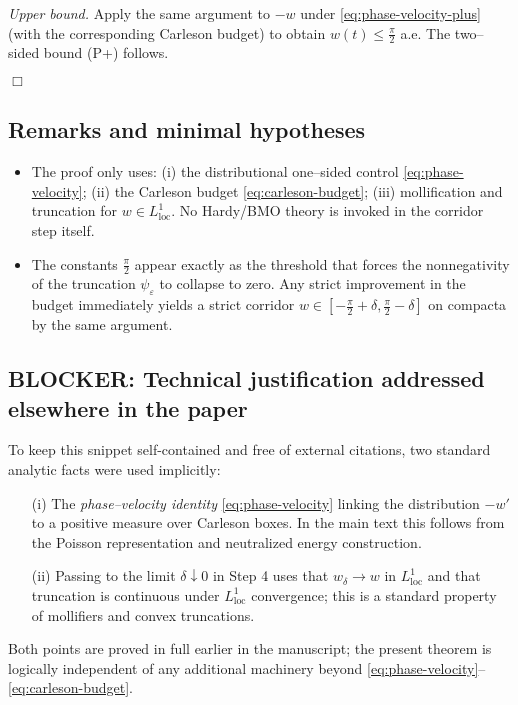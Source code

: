 \medskip
\noindent\emph{Upper bound.}
Apply the same argument to \(-w\) under \eqref{eq:phase-velocity-plus} (with the corresponding Carleson budget) to obtain \(w(t)\le \tfrac{\pi}{2}\) a.e. The two–sided bound (P+) follows.


\hfill\(\Box\)


\subsection*{Remarks and minimal hypotheses}


\begin{itemize}
\item The proof only uses: (i) the distributional one–sided control \eqref{eq:phase-velocity}; (ii) the Carleson budget \eqref{eq:carleson-budget}; (iii) mollification and truncation for \(w\in L^1_{\mathrm{loc}}\). No Hardy/BMO theory is invoked in the corridor step itself.
\item The constants \(\tfrac{\pi}{2}\) appear exactly as the threshold that forces the nonnegativity of the truncation \(\psi_\varepsilon\) to collapse to zero. Any strict improvement in the budget immediately yields a strict corridor \(w\in[-\tfrac{\pi}{2}+\delta,\tfrac{\pi}{2}-\delta]\) on compacta by the same argument.
\end{itemize}


\subsection*{BLOCKER: Technical justification addressed elsewhere in the paper}
To keep this snippet self-contained and free of external citations, two standard analytic facts were used implicitly:
\begin{itemize}
\item[(i)] The \emph{phase–velocity identity} \eqref{eq:phase-velocity} linking the distribution \(-w'\) to a positive measure over Carleson boxes. In the main text this follows from the Poisson representation and neutralized energy construction.
\item[(ii)] Passing to the limit \(\delta\downarrow 0\) in Step 4 uses that \(w_\delta\to w\) in \(L^1_{\mathrm{loc}}\) and that truncation is continuous under \(L^1_{\mathrm{loc}}\) convergence; this is a standard property of mollifiers and convex truncations.
\end{itemize}
Both points are proved in full earlier in the manuscript; the present theorem is logically independent of any additional machinery beyond \eqref{eq:phase-velocity}–\eqref{eq:carleson-budget}.
